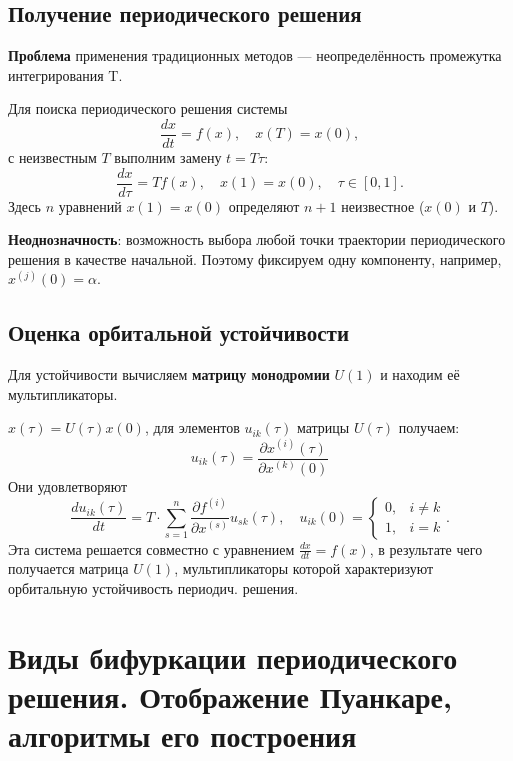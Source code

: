 	\subsection{Получение периодического решения}
	\textbf{Проблема} применения традиционных методов — неопределённость промежутка интегрирования T.
	\par
	Для поиска периодического решения системы
	\begin{equation}
		\frac{d x}{d t} = f(x), \quad x(T) = x(0),
	\end{equation}
	с неизвестным \( T \) выполним замену \( t = T \tau \):
	\begin{equation}
		\frac{d x}{d \tau} = T f(x), \quad x(1) = x(0), \quad \tau \in [0,1].
	\end{equation}
	Здесь \( n \) уравнений \( x(1) = x(0) \) определяют \( n+1 \) неизвестное (\( x(0) \) и \( T \)). 
	\par
	\textbf{Неоднозначность}: возможность выбора любой точки траектории периодического решения в качестве начальной. Поэтому фиксируем одну компоненту, например, \( x^{(j)}(0) = \alpha \).
	
	\subsection{Оценка орбитальной устойчивости}
	Для устойчивости вычисляем \textbf{матрицу монодромии} \( U(1) \) и находим её мультипликаторы.
	\par
	\(x(\tau) = U(\tau) x(0)\), для элементов \(u_{ik} (\tau)\) матрицы \(U(\tau)\) получаем:
	\begin{equation}
		u_{ik}(\tau) = \frac{\partial x^{(i)}(\tau)}{\partial x^{(k)}(0)}
	\end{equation} 
	Они удовлетворяют
	\begin{equation}
		\frac{d u_{ik}(\tau)}{dt} = T \cdot \sum_{s=1}^{n} \frac{\partial f^{(i)}}{\partial x^{(s)}} u_{sk}(\tau), 
		\quad u_{ik}(0) = 
		\begin{cases}
			0, & i \ne k \\
			1, & i = k
		\end{cases}.
	\end{equation}
	Эта система решается совместно с уравнением \(\frac{d x}{d t} = f(x)\), в результате чего получается матрица \(U(1)\), мультипликаторы которой характеризуют орбитальную устойчивость периодич. решения.
	
	\newpage
	
	\section{Виды бифуркации периодического решения. Отображение Пуанкаре, алгоритмы его построения}
